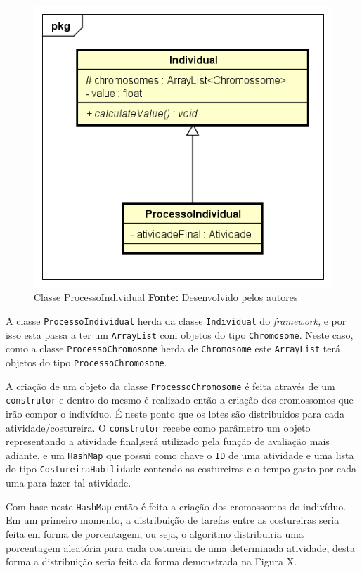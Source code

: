 \begin{figure}[h!]
	\centerline{\includegraphics[scale=0.9]{./imagens/class_individual.png}}
	\caption[Classe CostureiraHabilidade]
	{Classe ProcessoIndividual \textbf{Fonte:} Desenvolvido pelos autores}
	\label{fig:exemplo1}
\end{figure}

\par A classe \texttt{ProcessoIndividual} herda da classe \texttt{Individual} do \textit{framework}, e por isso
esta passa a ter um \texttt{ArrayList} com objetos do tipo \texttt{Chromosome}. Neste caso, como a classe
\texttt{ProcessoChromosome} herda de \texttt{Chromosome} este \texttt{ArrayList} terá objetos do tipo 
\texttt{ProcessoChromosome}.

\par A criação de um objeto da classe \texttt{ProcessoChromosome} é feita através de um \texttt{construtor} e dentro 
do mesmo é realizado então a criação dos cromossomos que irão compor o indivíduo. É neste ponto que os lotes são 
distribuídos para cada atividade/costureira. O \texttt{construtor} recebe como parâmetro um objeto representando 
a atividade final,será utilizado pela função de avaliação mais adiante, e um \texttt{HashMap} que possui como chave
o \texttt{ID} de uma atividade e uma lista do  tipo \texttt{CostureiraHabilidade} contendo as costureiras e o tempo 
gasto por cada uma para fazer tal atividade.

\par Com base neste \texttt{HashMap} então é feita a criação dos cromossomos do indivíduo.
Em um primeiro momento, a distribuição de tarefas entre as costureiras seria feita em forma 
de porcentagem, ou seja, o algoritmo distribuiria uma porcentagem aleatória para cada costureira de 
uma determinada atividade, desta forma a distribuição seria feita da forma demonstrada na Figura X.


